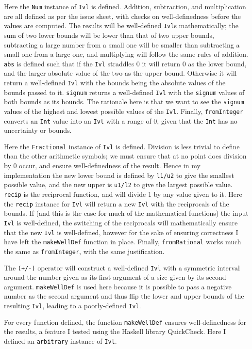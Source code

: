 \documentclass[11pt]{article}
\begin{document}
Here the \verb|Num| instance of \verb|Ivl| is defined.
Addition, subtraction, and multiplication are all defined as per the issue sheet, with checks on well-definedness before the values are computed.
The results will be well-defined \verb|Ivl|s mathematically; the sum of two lower bounds will be lower than that of two upper bounds, subtracting a large number from a small one will be smaller than subtracting a small one from a large one, and multiplying will follow the same rules of addition.
\verb|abs| is defined such that if the \verb|Ivl| straddles 0 it will return 0 as the lower bound, and the larger absolute value of the two as the upper bound.
Otherwise it will return a well-defined \verb|Ivl| with the bounds being the absolute values of the bounds passed to it.
\verb|signum| returns a well-defined \verb|Ivl| with the \verb|signum| values of both bounds as its bounds.
The rationale here is that we want to see the \verb|signum| values of the highest and lowest possible values of the \verb|Ivl|.
Finally, \verb|fromInteger| converts an \verb|Int| value into an \verb|Ivl| with a range of 0, given that the \verb|Int| has no uncertainty or bounds.


Here the \verb|Fractional| instance of \verb|Ivl| is defined.
Division is less trivial to define than the other arithmetic symbols; we must ensure that at no point does division by 0 occur, and ensure well-definedness of the result.
Hence in my implementation the new lower bound is defined by \verb|l1/u2| to give the smallest possible value, and the new upper is \verb|u1/l2| to give the largest possible value.
\verb|recip| is the reciprocal function, and will divide 1 by any value given to it.
Here the \verb|recip| instance for \verb|Ivl| will return a new \verb|Ivl| with the reciprocals of the bounds.
If (and this is the case for much of the mathematical functions) the input \verb|Ivl| is well-defined, the switching of the reciprocals will mathematically ensure that the new \verb|Ivl| is well-defined, however for the sake of ensuring correctness I have left the \verb|makeWellDef| function in place.
Finally, \verb|fromRational| works much the same as \verb|fromInteger|, with the same justification.


The \verb|(+/-)| operator will construct a well-defined \verb|Ivl| with a symmetric interval around the number given as its first argument of a size given by its second argument.
\verb|makeWellDef| is used here because it is possible to pass a negative number as the second argument and thus flip the lower and upper bounds of the resulting \verb|Ivl|, leading to a poorly-defined \verb|Ivl|.
\par
For every function defined, the function \verb|makeWellDef| ensures well-definedness for the results, a feature I tested using the Haskell library QuickCheck.
Here I defined an \verb|arbitrary| instance of \verb|Ivl|.
\end{document}
